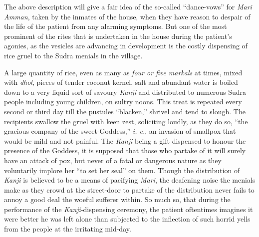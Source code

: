 \documentclass[a4paper, 12pt, oneside, english]{article}
\begin{document}
The above description will give a fair idea of the so-called ``dance-vows'' for \emph{Mari Amman}, taken by the inmates of the house, when they have reason to despair of the life of the patient from any alarming symptoms. But one of the most prominent of the rites that is undertaken in the house during the patient's agonies, as the vesicles are advancing in development is the costly dispensing of rice gruel to the Sudra menials in the village.

A large quantity of rice, even as many as \emph{four or five markals} at times, mixed with \emph{dhol}, pieces of tender coconut kernel, salt and abundant water is boiled down to a very liquid sort of savoury \emph{Kanji} and distributed to numerous Sudra people including young children, on sultry noons. This treat is repeated every second or third day till the pustules ``blacken,'' shrivel and tend to slough. The recipients swallow the gruel with keen zest, soliciting loudly, as they do so, ``the gracious company of the sweet-Goddess,'' \emph{i. e.}, an invasion of smallpox that would be mild and not painful. The \emph{Kanji} being a gift dispensed to honour the presence of the Goddess, it is supposed that those who partake of it will surely have an attack of pox, but never of a fatal or dangerous nature as they voluntarily implore her ``to set her seal'' on them. Though the distribution of \emph{Kanji} is believed to be a means of pacifying \emph{Mari}, the deafening noise the menials make as they crowd at the street-door to partake of the distribution never fails to annoy a good deal the woeful sufferer within. So much so, that during the performance of the \emph{Kanji}-dispensing ceremony, the patient oftentimes imagines it were better he was left alone than subjected to the inflection of such horrid yells from the people at the irritating mid-day.
\end{document}
